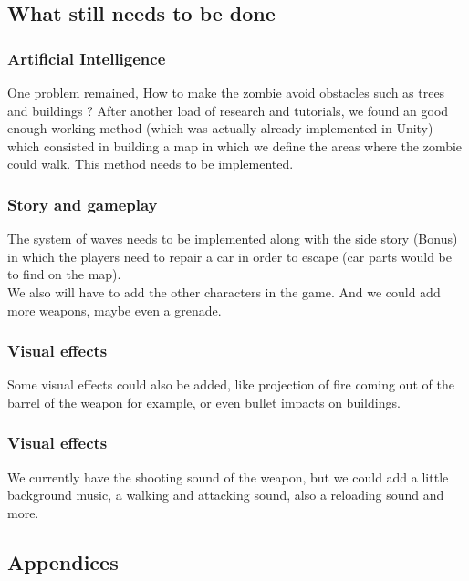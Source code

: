 \documentclass[12pt]{article}
\begin{document}
\subsection{What still needs to be done}
		
	\subsubsection{Artificial Intelligence}
        One problem remained, How to make the zombie avoid obstacles such as trees and buildings ? After another load of research and tutorials, we found an good enough working method (which was actually already implemented in Unity) which consisted in building a map in which we define the areas where the zombie could walk. This method needs to be implemented.
        \bigskip
        
    \subsubsection{Story and gameplay}
    	The system of waves needs to be implemented along with the side story (Bonus) in which the players need to repair a car in order to escape (car parts would be to find on the map).\\
        We also will have to add the other characters in the game. And we could add more weapons, maybe even a grenade.
        \bigskip
        
    \subsubsection{Visual effects}
        Some visual effects could also be added, like projection of fire coming out of the barrel of the weapon for example, or even bullet impacts on buildings.
        \bigskip
    
    \subsubsection{Visual effects}
    	We currently have the shooting sound of the weapon, but we could add a little background music, a walking and attacking sound, also a reloading sound and more.
    \bigskip\bigskip
    

\subsection{Appendices}
\end{document}
